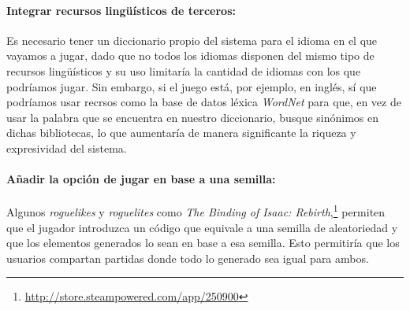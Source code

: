 \paragraph{Integrar recursos lingüísticos de terceros:} Es necesario tener un diccionario propio del sistema para el idioma en el que vayamos a jugar, dado que no todos los idiomas disponen del mismo tipo de recursos lingüísticos y su uso limitaría la cantidad de idiomas con los que podríamos jugar. Sin embargo, si el juego está, por ejemplo, en inglés, sí que podríamos usar recrsos como la base de datos léxica \textit{WordNet}\cite{MilBecFelGroMil90a} para que, en vez de usar la palabra que se encuentra en nuestro diccionario, busque sinónimos en dichas bibliotecas, lo que aumentaría de manera significante la riqueza y expresividad del sistema. 

\paragraph{Añadir la opción de jugar en base a una semilla:} Algunos \textit{roguelikes} y \textit{roguelites} como \textit{The Binding of Isaac: Rebirth},\footnote{\url{http://store.steampowered.com/app/250900}} permiten que el jugador introduzca un código que equivale a una semilla de aleatoriedad y que los elementos generados lo sean en base a esa semilla.\cite{Betts2014a} Esto permitiría que los usuarios compartan partidas donde todo lo generado sea igual para ambos.